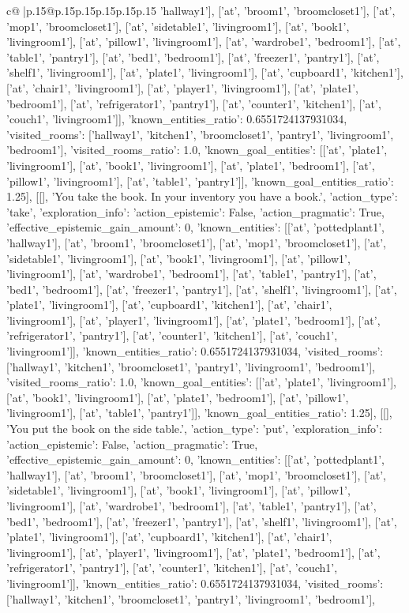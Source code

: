 \documentclass{article}
\begin{document}
{\begin{supertabular}{c@{$\;$}|p{.15\linewidth}@{}p{.15\linewidth}p{.15\linewidth}p{.15\linewidth}p{.15\linewidth}p{.15\linewidth}}
{{{'hallway1'], ['at', 'broom1', 'broomcloset1'], ['at', 'mop1', 'broomcloset1'], ['at', 'sidetable1', 'livingroom1'], ['at', 'book1', 'livingroom1'], ['at', 'pillow1', 'livingroom1'], ['at', 'wardrobe1', 'bedroom1'], ['at', 'table1', 'pantry1'], ['at', 'bed1', 'bedroom1'], ['at', 'freezer1', 'pantry1'], ['at', 'shelf1', 'livingroom1'], ['at', 'plate1', 'livingroom1'], ['at', 'cupboard1', 'kitchen1'], ['at', 'chair1', 'livingroom1'], ['at', 'player1', 'livingroom1'], ['at', 'plate1', 'bedroom1'], ['at', 'refrigerator1', 'pantry1'], ['at', 'counter1', 'kitchen1'], ['at', 'couch1', 'livingroom1']], 'known_entities_ratio': 0.6551724137931034, 'visited_rooms': ['hallway1', 'kitchen1', 'broomcloset1', 'pantry1', 'livingroom1', 'bedroom1'], 'visited_rooms_ratio': 1.0, 'known_goal_entities': [['at', 'plate1', 'livingroom1'], ['at', 'book1', 'livingroom1'], ['at', 'plate1', 'bedroom1'], ['at', 'pillow1', 'livingroom1'], ['at', 'table1', 'pantry1']], 'known_goal_entities_ratio': 1.25}}], [[], 'You take the book. In your inventory you have a book.', {'action_type': 'take', 'exploration_info': {'action_epistemic': False, 'action_pragmatic': True, 'effective_epistemic_gain_amount': 0, 'known_entities': [['at', 'pottedplant1', 'hallway1'], ['at', 'broom1', 'broomcloset1'], ['at', 'mop1', 'broomcloset1'], ['at', 'sidetable1', 'livingroom1'], ['at', 'book1', 'livingroom1'], ['at', 'pillow1', 'livingroom1'], ['at', 'wardrobe1', 'bedroom1'], ['at', 'table1', 'pantry1'], ['at', 'bed1', 'bedroom1'], ['at', 'freezer1', 'pantry1'], ['at', 'shelf1', 'livingroom1'], ['at', 'plate1', 'livingroom1'], ['at', 'cupboard1', 'kitchen1'], ['at', 'chair1', 'livingroom1'], ['at', 'player1', 'livingroom1'], ['at', 'plate1', 'bedroom1'], ['at', 'refrigerator1', 'pantry1'], ['at', 'counter1', 'kitchen1'], ['at', 'couch1', 'livingroom1']], 'known_entities_ratio': 0.6551724137931034, 'visited_rooms': ['hallway1', 'kitchen1', 'broomcloset1', 'pantry1', 'livingroom1', 'bedroom1'], 'visited_rooms_ratio': 1.0, 'known_goal_entities': [['at', 'plate1', 'livingroom1'], ['at', 'book1', 'livingroom1'], ['at', 'plate1', 'bedroom1'], ['at', 'pillow1', 'livingroom1'], ['at', 'table1', 'pantry1']], 'known_goal_entities_ratio': 1.25}}], [[], 'You put the book on the side table.', {'action_type': 'put', 'exploration_info': {'action_epistemic': False, 'action_pragmatic': True, 'effective_epistemic_gain_amount': 0, 'known_entities': [['at', 'pottedplant1', 'hallway1'], ['at', 'broom1', 'broomcloset1'], ['at', 'mop1', 'broomcloset1'], ['at', 'sidetable1', 'livingroom1'], ['at', 'book1', 'livingroom1'], ['at', 'pillow1', 'livingroom1'], ['at', 'wardrobe1', 'bedroom1'], ['at', 'table1', 'pantry1'], ['at', 'bed1', 'bedroom1'], ['at', 'freezer1', 'pantry1'], ['at', 'shelf1', 'livingroom1'], ['at', 'plate1', 'livingroom1'], ['at', 'cupboard1', 'kitchen1'], ['at', 'chair1', 'livingroom1'], ['at', 'player1', 'livingroom1'], ['at', 'plate1', 'bedroom1'], ['at', 'refrigerator1', 'pantry1'], ['at', 'counter1', 'kitchen1'], ['at', 'couch1', 'livingroom1']], 'known_entities_ratio': 0.6551724137931034, 'visited_rooms': ['hallway1', 'kitchen1', 'broomcloset1', 'pantry1', 'livingroom1', 'bedroom1'], }}}
\end{supertabular}}
\end{document}
